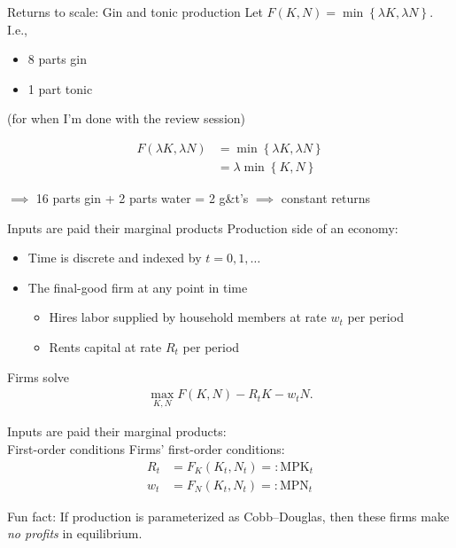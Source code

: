 \documentclass[presentation,dvipsnames]{beamer}
\begin{document}
\begin{frame}[label=sec-2-6]{Returns to scale: Gin and tonic production}
Let $F(K,N) = \min \left\{ \lambda K, \lambda N \right\}$. I.e.,
\begin{itemize}[label={--}]
\item 8 parts gin
\item 1 part tonic
\end{itemize}
(for when I'm done with the review session)

\begin{align*}
F(\lambda K, \lambda N) &= \min \left\{ \lambda K, \lambda N \right\} \\
&= \lambda \min \left\{ K,N \right\}
\end{align*}

$\implies$ 16 parts gin + 2 parts water = 2 g\&t's $\implies$ constant returns
\end{frame}

\begin{frame}[label=sec-2-7]{Inputs are paid their marginal products}
Production side of an economy:
\begin{itemize}[label={--}]
\item Time is discrete and indexed by $t=0,1,\dots$
\item The final-good firm at any point in time
\begin{itemize}[label={--}]
\item Hires labor supplied by household members at rate $w_{t}$ per period
\item Rents capital at rate $R_{t}$ per period 
\end{itemize}
\end{itemize}

Firms solve
\begin{align*}
\max_{K,N} F(K,N) - R_{t}K - w_{t}N.
\end{align*}
\end{frame}

\begin{frame}[label=sec-2-7]{Inputs are paid their marginal products: \\ First-order conditions}
Firms' first-order conditions:
\begin{align*}
R_{t} &= F_{K}(K_{t},N_{t}) =: \text{MPK}_{t} \\
w_{t} &= F_{N}(K_{t},N_{t}) =: \text{MPN}_{t}
\end{align*}

\textcolor{RubineRed}{Fun fact}: If production is parameterized as Cobb--Douglas,
then these firms make \emph{no profits} in equilibrium.
\end{frame}
\end{document}
